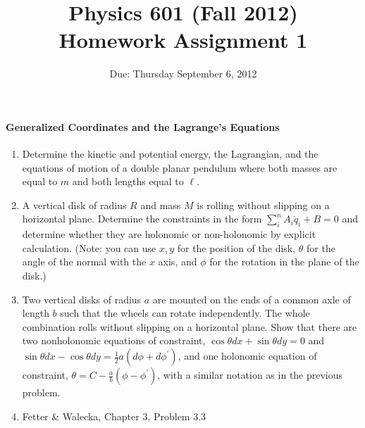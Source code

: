 \documentclass[letterpaper,11pt]{article}
\title{Physics 601 (Fall 2012) \\ Homework Assignment 1}
\date{Due: Thursday September 6, 2012}
\begin{document}
\maketitle

\paragraph*{Generalized Coordinates and the Lagrange's Equations}
\begin{enumerate}
 \item Determine the kinetic and potential energy, the Lagrangian, and the equations of motion of a double planar pendulum where both masses are equal to $m$ and both lengths equal to $\ell$.
 \item A vertical disk of radius $R$ and mass $M$ is rolling without slipping on a horizontal plane.  Determine the constraints in the form $\sum_i^n A_i \dot{q}_i + B = 0$ and determine whether they are holonomic or non-holonomic by explicit calculation.  (Note: you can use $x,y$ for the position of the disk, $\theta$ for the angle of the normal with the $x$ axis, and $\phi$ for the rotation in the plane of the disk.)
 \item Two vertical disks of radius $a$ are mounted on the ends of a common axle of length $b$ such that the wheels can rotate independently.  The whole combination rolls without slipping on a horizontal plane.  Show that there are two nonholonomic equations of constraint, $\cos\theta dx + \sin\theta dy = 0$ and $\sin\theta dx - \cos\theta dy = \frac{1}{2} a (d\phi+d\phi^\prime)$, and one holonomic equation of constraint, $\theta = C - \frac{a}{b}(\phi-\phi^\prime)$, with a similar notation as in the previous problem.
 \item Fetter \& Walecka, Chapter 3, Problem 3.3
\end{enumerate}
\end{document}
